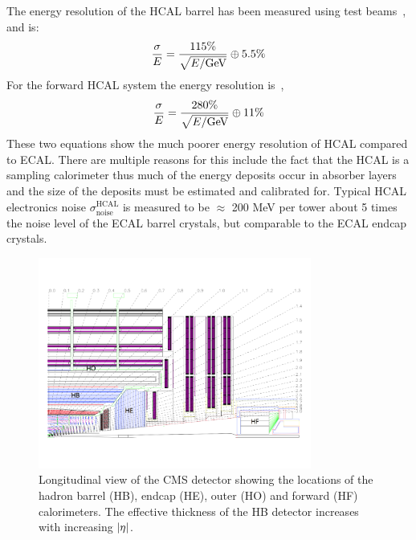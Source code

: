 The energy resolution of the HCAL barrel has been measured using test beams~\cite{Elvira:800406}, and is:
\begin{equation}
\label{eqn:hcal_res}
\frac{\sigma}{E} = \frac{115\%}{\sqrt{E/\mathrm{GeV}}} \oplus 5.5\%
\end{equation}
For the forward HCAL system the energy resolution is~\cite{Baiatian:951395},
\begin{equation}
\label{eqn:hcal_res}
\frac{\sigma}{E} = \frac{280\%}{\sqrt{E/\mathrm{GeV}}} \oplus 11\%
\end{equation}
These two equations show the much poorer energy resolution of HCAL compared to ECAL.
There are multiple reasons for this include the fact that the HCAL is a sampling 
calorimeter thus much of the energy deposits occur in absorber layers and the 
size of the deposits must be estimated and calibrated for.
Typical HCAL electronics noise $\sigma ^{\text{HCAL}} _{\text{noise}}$ 
is measured to be $\approx$ 200 MeV per tower about 5 times the noise level of
the ECAL barrel crystals, but comparable to the ECAL endcap crystals.

\begin{figure}[htbp]
\centering
     \includegraphics[width=0.8\textwidth]{cms_and_lhc/plots/cms_hcal.pdf}
     \caption{
Longitudinal view of the CMS detector showing the locations of the hadron 
barrel (HB), endcap (HE), outer (HO) and forward (HF) calorimeters. The
effective thickness of the HB detector increases with increasing $\lvert\eta\rvert$.
     }
     \label{fig:cms_hcal}
\end{figure}




